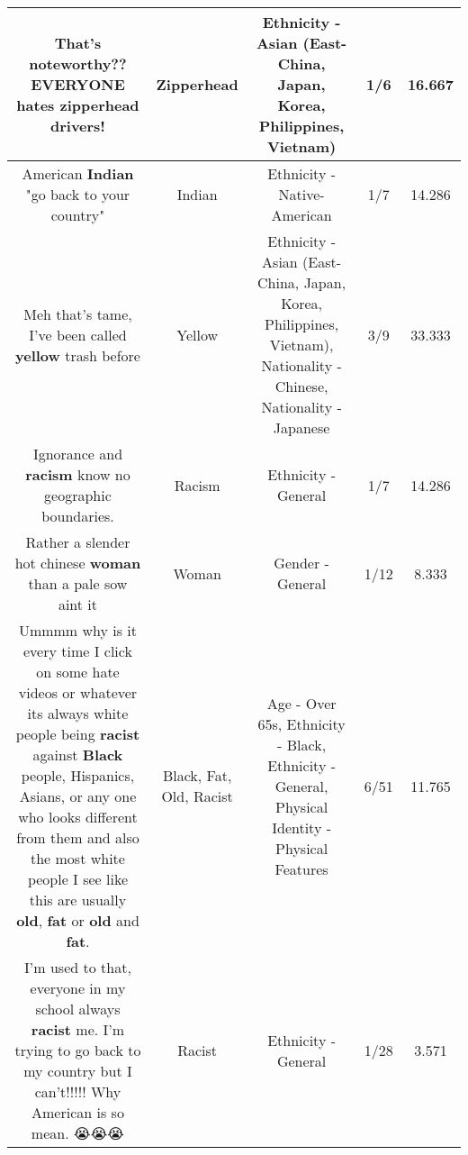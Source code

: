 \documentclass[11pt]{article}
\newlength\mylength
\begin{document}
\begin{center}
\begin{longtable}{|C{.65\mylength}|C{.30\mylength}|C{.12\mylength}|C{.12\mylength}|C{.12\mylength}|}
  \small That's noteworthy??  EVERYONE hates \textbf{zipperhead} drivers!\normalsize   & Zipperhead & Ethnicity - Asian (East- China, Japan, Korea, Philippines, Vietnam) & 1/6 & 16.667 \\  \hline
  \small American \textbf{Indian} "go back to your country"\normalsize   & Indian & Ethnicity - Native-American & 1/7 & 14.286 \\  \hline
  \small Meh that's tame, I've been called \textbf{y\textbf{e\textbf{llow}}} trash before\normalsize   & Yellow & Ethnicity - Asian (East- China, Japan, Korea, Philippines, Vietnam), Nationality - Chinese, Nationality - Japanese & 3/9 & 33.333 \\  \hline
  \small Ignorance and \textbf{racism} know no geographic boundaries.\normalsize   & Racism & Ethnicity - General & 1/7 & 14.286 \\  \hline
  \small Rather a slender hot chinese \textbf{woman} than a pale sow aint it\normalsize   & Woman & Gender - General & 1/12 & 8.333 \\  \hline
  \small Ummmm why is it every time I click on some hate videos or whatever its always white people being \textbf{racist} against \textbf{Black} people, Hispanics, Asians, or any one who looks different from them and also the most white people I see like this are usually \textbf{old}, \textbf{fat} or \textbf{old} and \textbf{fat}.\normalsize   & Black, Fat, Old, Racist & Age - Over 65s, Ethnicity - Black, Ethnicity - General, Physical Identity - Physical Features & 6/51 & 11.765 \\  \hline
  \small I'm used to that, everyone in my school always \textbf{racist} me. I'm trying to go back to my country but I can't!!!!! Why American is so mean. 😭😭😭\normalsize   & Racist & Ethnicity - General & 1/28 & 3.571 \\  \hline

\end{longtable}
\end{center}
\end{document}
